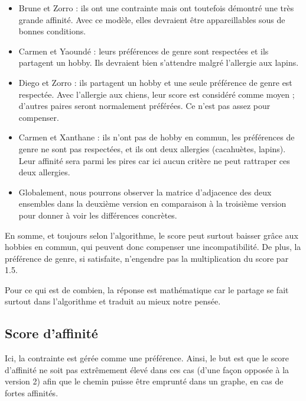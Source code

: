 \documentclass{mytex}
\begin{document}


\begin{itemize}
    \item Brune et Zorro : ils ont une contrainte mais ont toutefois démontré une très grande affinité. Avec ce modèle, elles devraient être appareillables sous de bonnes conditions.
    \item Carmen et Yaoundé : leurs préférences de genre sont respectées et ils partagent un hobby. Ils devraient bien s'attendre malgré l'allergie aux lapins.
    \item Diego et Zorro : ils partagent un hobby et une seule préférence de genre est respectée. Avec l'allergie aux chiens, leur score est considéré comme moyen ; d'autres paires seront normalement préférées. Ce n'est pas assez pour compenser.
    \item Carmen et Xanthane : ils n'ont pas de hobby en commun, les préférences de genre ne sont pas respectées, et ils ont deux allergies (cacahuètes, lapins). Leur affinité sera parmi les pires car ici aucun critère ne peut rattraper ces deux allergies.
    \item Globalement, nous pourrons observer la matrice d'adjacence des deux ensembles dans la deuxième version en comparaison à la troisième version pour donner à voir les différences concrètes.
\end{itemize}

En somme, et toujours selon l'algorithme, le score peut surtout baisser grâce aux hobbies en commun, qui peuvent donc compenser une incompatibilité.
De plus, la préférence de genre, si satisfaite, n'engendre pas la multiplication du score par 1.5.

Pour ce qui est de combien, la réponse est mathématique car le partage se fait surtout dans l'algorithme et traduit au mieux notre pensée.

\subsection{Score d'affinité}


Ici, la contrainte est gérée comme une préférence. Ainsi, le but est que le score d'affinité ne soit pas extrêmement élevé dans ces cas (d'une façon opposée à la version 2) afin que le chemin puisse être emprunté dans un graphe, en cas de fortes affinités.
\end{document}
